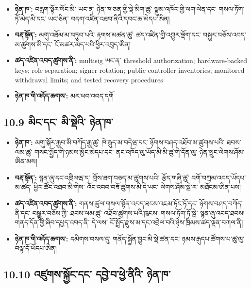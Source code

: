 \documentclass[11pt]{article}
\begin{document}
\begin{itemize}[leftmargin=*]
\item \textbf{ཉེན་ཁ་:} བརླག་སྟོར་སོང་མི་ ཡང་ན་ ཉེན་ཁ་ཅན་གྱི་ལྡེ་མིག་ཚུ་ སྣུམ་འཁོར་གྱི་ལག་ལེན་དང་ གསལ་ཏོག་ཏོ་མེད་མི་དང་ ཡང་ཅིན་ བདག་འཛིན་འཐབ་ནིའི་དབང་ཆ་མེདཔ་ཨིན།
\item \textbf{བརྡ་སྟོན་:} མགུ་འཐོམ་མ་བཏུབ་པའི་ རྟགས་མཚན་ཚུ་ ཚད་འཛིན་གྱི་འགྱུར་ལྡོག་དང་ བསྒྱུར་བཅོས་འབད་མ་ཚུགས་མི་དང་ ངོ་མཚར་མེད་པའི་ཕྱིར་འབུད་ཨིན།
\item \textbf{ཚད་འཛིན་འབད་ཚུགས་ནི་:} multisig ཡང་ན་ threshold authorization; hardware-backed keys; role separation; signer rotation; public controller inventories; monitored withdrawal limits; and tested recovery procedures
\item \textbf{ཉེན་ཁ་གི་འདོད་ཆགས་:} མར་ཕབ་འབད་དགོ
\end{itemize}
\subsection*{10.9 མིང་དང་ མི་སྡེའི་ ཉེན་ཁ་}

\begin{itemize}[leftmargin=*]
\item \textbf{ཉེན་ཁ་:} མགུ་སྐོར་རྐྱབ་མི་བཀོད་རྒྱ་ཚུ་ ཁེ་རྒུད་མ་བདེཝ་དང་ ཉོགས་བཤད་འཐོབ་མ་ཚུགས་པའི་ ཐབས་ལམ་ཚུ་ གསང་སྤྱོད་གི་ཉམས་མྱོང་མེདཔ་དང་ ནང་འཁོད་ལུ་ཡོད་མི་མི་ཚུ་གི་དོན་ལུ་ ཉེན་སྲུང་ལེགས་ཤོམ་ཨིན་མས།
\item \textbf{བརྡ་སྟོན་:} སྙན་ཞུ་དང་འཁྲིལཝ་ད་ གྲོས་ཐག་བཅད་མ་ཚུགས་པའི་ རྩོད་གཞི་ཚུ་ བགོ་བཀྲམ་འབད་ཡོདཔ་མ་ཚད་ ཕྱིར་ཚོང་འཐབ་མི་གིས་ འོང་འབབ་བཟོ་ཚུགས་མི་དེ་ཡང་ ལེགས་ཤོམ་སྦེ་ར་ མཐོངམ་ཨིན་པས།
\item \textbf{ཚད་འཛིན་འབད་ཚུགས་ནི་:} གནས་ཚུལ་གསལ་སྟོན་འབད་ཐངས་འཇམ་ཏོང་ཏོ་དང་ ཉོགས་བཤད་བཀོད་ནི་དང་ བསྒྱུར་བཅོས་ཀྱི་ ཐབས་ལམ་ཚུ་ འཐོབ་ཚུགས་པའི་ཁུངས་ གསལ་ཏོག་ཏོ་སྦེ་ སྙན་ཞུ་འབད་ཐབས། གནད་དོན་གྱི་ཞིབ་དཔྱད་འབད་ནི་ དེ་ལས་ ངོ་སྤྲོད་རྫུས་མ་དང་འབྲེལ་བའི་ཉེས་ཁྲིམས་ཚད་ལྡན་བཀལ་ནི།
\item \textbf{ཉེན་ཁ་གི་འདོད་ཆགས་:} དམིགས་བསལ་དུ་ གནོད་སྐྱོན་བྱུང་མི་སྡེ་ཚན་དང་ ཉམས་རྒུདཔ་ཚོགས་པ་ཚུ་ལུ་ བལྟ་དོ་ཡོདཔ་ཨིན།
\end{itemize}
\subsection*{10.10 འཛུགས་སྐྱོང་དང་ དབྱེ་བ་ཕྱེ་ནིའི་ ཉེན་ཁ་}
\end{document}

